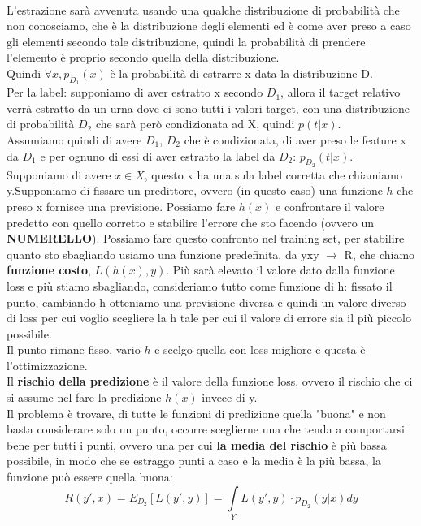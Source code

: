\documentclass[12pt, oneside]{extbook}
\begin{document}
\\L'estrazione sarà avvenuta usando una qualche distribuzione di probabilità che non conosciamo, che è la distribuzione degli elementi ed è come aver preso a caso gli elementi secondo tale distribuzione, quindi la probabilità di prendere l'elemento è proprio secondo quella della distribuzione.\\Quindi $\forall x, p_{D_1}(x)$ è la probabilità di estrarre x data la distribuzione D.\\Per la label: supponiamo di aver estratto x secondo $D_1$, allora il target relativo verrà estratto da un urna dove ci sono tutti i valori target, con una distribuzione di probabilità $D_2$ che sarà però condizionata ad X, quindi $p(t|x)$.\\Assumiamo quindi di avere $D_1$, $D_2$ che è condizionata, di aver preso le feature x da $D_1$ e per ognuno di essi di aver estratto la label da $D_2$: $p_{D_2}(t|x)$.\\Supponiamo di avere $x \in X$, questo x ha una sula label corretta che chiamiamo y.Supponiamo di fissare un predittore, ovvero (in questo caso) una funzione $h$ che preso x fornisce una previsione. Possiamo fare $h(x)$ e confrontare il valore predetto con quello corretto e stabilire l'errore che sto facendo (ovvero un \textbf{NUMERELLO}). Possiamo fare questo confronto nel training set, per stabilire quanto sto sbagliando usiamo una funzione predefinita, da yxy $\rightarrow$ R, che chiamo \textbf{funzione costo}, $L(h(x), y)$. Più sarà elevato il valore dato dalla funzione loss e più stiamo sbagliando, consideriamo tutto come funzione di h: fissato il punto, cambiando h otteniamo una previsione diversa e quindi un valore diverso di loss per cui voglio scegliere la h tale per cui il valore di errore sia il più piccolo possibile.\\Il punto rimane fisso, vario $h$ e scelgo quella con loss migliore e questa è l'ottimizzazione.\\Il \textbf{rischio della predizione} è il valore della funzione loss, ovvero il rischio che ci si assume nel fare la predizione $h(x)$ invece di y.\\Il problema è trovare, di tutte le funzioni di predizione quella "buona" e non basta considerare solo un punto, occorre sceglierne una che tenda a comportarsi bene per tutti i punti, ovvero una per cui \textbf{la media del rischio} è più bassa possibile, in modo che se estraggo punti a caso e la media è la più bassa, la funzione può essere quella buona:
\begin{equation}
	R(y', x) = E_ {D_2}[L(y', y)] = \int\limits_{Y} L(y', y) \cdot p_{D_2}(y|x) dy
\end{equation}
\end{document}
